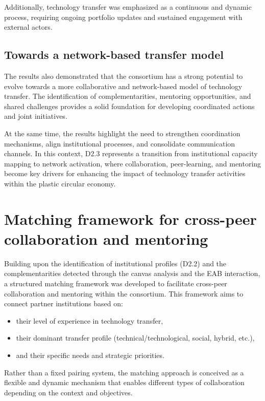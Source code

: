 \documentclass[
  12pt,
  oneside]{book}
\providecommand{\tightlist}{%
  \setlength{\itemsep}{0pt}\setlength{\parskip}{0pt}}
\begin{document}
Additionally, technology transfer was emphasized as a continuous and
dynamic process, requiring ongoing portfolio updates and sustained
engagement with external actors.

\subsection{Towards a network-based transfer
model}\label{towards-a-network-based-transfer-model}

The results also demonstrated that the consortium has a strong potential
to evolve towards a more collaborative and network-based model of
technology transfer. The identification of complementarities, mentoring
opportunities, and shared challenges provides a solid foundation for
developing coordinated actions and joint initiatives.

At the same time, the results highlight the need to strengthen
coordination mechanisms, align institutional processes, and consolidate
communication channels. In this context, D2.3 represents a transition
from institutional capacity mapping to network activation, where
collaboration, peer-learning, and mentoring become key drivers for
enhancing the impact of technology transfer activities within the
plastic circular economy.

\section{Matching framework for cross-peer collaboration and
mentoring}\label{matching-framework-for-cross-peer-collaboration-and-mentoring}

Building upon the identification of institutional profiles (D2.2) and
the complementarities detected through the canvas analysis and the EAB
interaction, a structured matching framework was developed to facilitate
cross-peer collaboration and mentoring within the consortium. This
framework aims to connect partner institutions based on:

\begin{itemize}
\tightlist
\item
  their level of experience in technology transfer,
\item
  their dominant transfer profile (technical/technological, social,
  hybrid, etc.),
\item
  and their specific needs and strategic priorities.
\end{itemize}

Rather than a fixed pairing system, the matching approach is conceived
as a flexible and dynamic mechanism that enables different types of
collaboration depending on the context and objectives.
\end{document}
